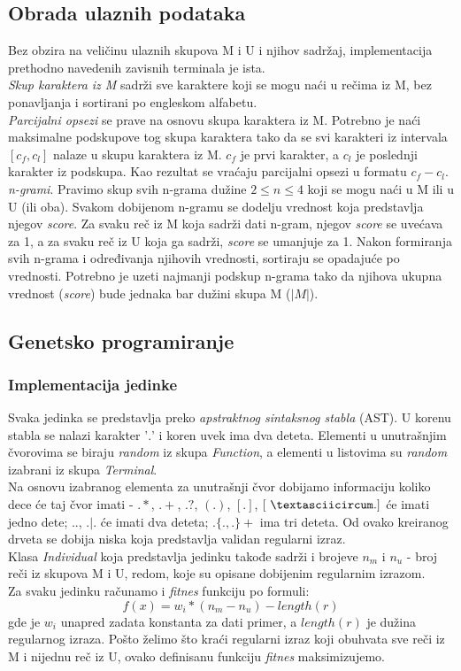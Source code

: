 \documentclass{article}
\begin{document}
\subsection{Obrada ulaznih podataka}
Bez obzira na veličinu ulaznih skupova M i U i njihov sadržaj, implementacija prethodno navedenih zavisnih terminala je ista. \\
\textit{Skup karaktera iz M} sadrži sve karaktere koji se mogu naći u rečima iz M, bez ponavljanja i sortirani po engleskom alfabetu. \\
\textit{Parcijalni opsezi} se prave na osnovu skupa karaktera iz M. Potrebno je naći maksimalne podskupove tog skupa karaktera tako da se svi karakteri iz intervala $[c_f, c_l]$ nalaze u skupu karaktera iz M. $c_f$ je prvi karakter, a $c_l$ je poslednji karakter iz podskupa. Kao rezultat se vraćaju parcijalni opsezi u formatu $c_f - c_l$. \\
\textit{n-grami}. Pravimo skup svih n-grama dužine $2 \leq n \leq 4$ koji se mogu naći u M ili u U (ili oba). Svakom dobijenom n-gramu se dodelju vrednost koja predstavlja njegov \textit{score}. Za svaku reč iz M koja sadrži dati n-gram, njegov \textit{score} se uvećava za 1, a za svaku reč iz U koja ga sadrži, \textit{score} se umanjuje za 1. Nakon formiranja svih n-grama i određivanja njihovih vrednosti, sortiraju se opadajuće po vrednosti.
Potrebno je uzeti najmanji podskup n-grama tako da njihova ukupna vrednost (\textit{score}) bude jednaka bar dužini skupa M ($|M|$).

\subsection{Genetsko programiranje}
\subsubsection{Implementacija jedinke}
Svaka jedinka se predstavlja preko \textit{apstraktnog sintaksnog stabla} (AST).
U korenu stabla se nalazi karakter '$.$' i koren uvek ima dva deteta. Elementi u unutrašnjim čvorovima se biraju \textit{random} iz skupa \textit{Function}, a elementi u listovima su \textit{random} izabrani iz skupa \textit{Terminal}. \\
Na osnovu izabranog elementa za unutrašnji čvor dobijamo informaciju koliko dece će taj čvor imati - $.*$, $.+$, $.?$, $(.)$, $[.]$, $[\ \textasciicircum .]$ će imati jedno dete; $..$, $.|.$ će imati dva deteta; $.\{.,.\}+$ ima tri deteta. 
Od ovako kreiranog drveta se dobija niska koja predstavlja validan regularni izraz. \\
Klasa \textit{Individual} koja predstavlja jedinku takođe sadrži i brojeve $n_m$ i $n_u$ - broj reči iz skupova M i U, redom, koje su opisane dobijenim regularnim izrazom. \\
Za svaku jedinku računamo i \textit{fitnes} funkciju po formuli:
$$f(x) = w_i * (n_m - n_u) - length(r)$$
gde je $w_i$ unapred zadata konstanta za dati primer, a $length(r)$ je dužina regularnog izraza. Pošto želimo što kraći regularni izraz koji obuhvata sve reči iz M i nijednu reč iz U, ovako definisanu funkciju \textit{fitnes} maksimizujemo.
\end{document}

